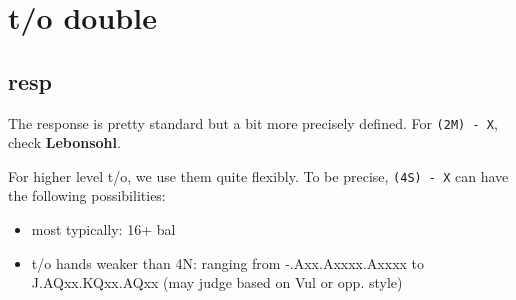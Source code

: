 \section{t/o double}


\subsection{resp}

The response is pretty standard but a bit more precisely defined. For \texttt{(2M) - X}, check \textbf{Lebonsohl}.



For higher level t/o, we use them quite flexibly. To be precise, \texttt{(4S) - X} can have the following possibilities:
\begin{itemize}
  \setlength\itemsep{0pt}
  \item most typically: 16+ bal
  \item t/o hands weaker than 4N: ranging from -.Axx.Axxxx.Axxxx to J.AQxx.KQxx.AQxx (may judge based on Vul or opp. style)
\end{itemize}

